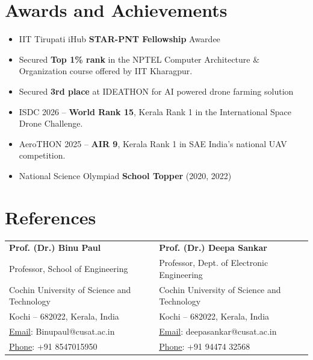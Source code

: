\documentclass{my_cv}
\begin{document}
\section{Awards and Achievements}

\begin{itemize}[leftmargin=10pt, itemsep=2pt]
    \item[\textbf{--}] IIT Tirupati iHub \textbf{STAR-PNT Fellowship} Awardee
    \item[\textbf{--}] Secured \textbf{Top 1\% rank} in the NPTEL Computer Architecture \& Organization course offered by IIT Kharagpur.
    \item[\textbf{--}] Secured \textbf{3rd place} at IDEATHON for AI powered drone farming solution
    \item[\textbf{--}] ISDC 2026 -- \textbf{World Rank 15}, Kerala Rank 1 in the International Space Drone Challenge.
    \item[\textbf{--}] AeroTHON 2025 -- \textbf{AIR 9}, Kerala Rank 1 in SAE India's national UAV competition.
    \item[\textbf{--}] National Science Olympiad \textbf{School Topper} (2020, 2022)
\end{itemize}

\vspace{-16pt}

\section{References}

\noindent
\begin{tabular*}{\textwidth}{p{}@{\extracolsep{\fill}}p{}}
    \textbf{Prof. (Dr.) Binu Paul} & \textbf{Prof. (Dr.) Deepa Sankar} \\
    {\small Professor, School of Engineering} & {\small Professor, Dept. of Electronic Engineering} \\
    {\small Cochin University of Science and Technology} & {\small Cochin University of Science and Technology} \\
    {\small Kochi -- 682022, Kerala, India} & {\small Kochi -- 682022, Kerala, India} \\
    {\small \underline{Email}: Binupaul@cusat.ac.in} & {\small \underline{Email}: deepasankar@cusat.ac.in} \\
    {\small \underline{Phone}: +91 8547015950} & {\small \underline{Phone}: +91 94474 32568} \\
\end{tabular*}


\end{document}
